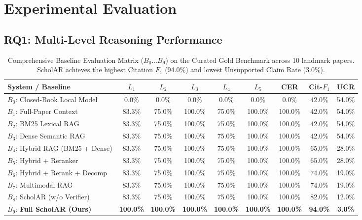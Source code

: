 \documentclass[11pt,a4paper]{article}
\begin{document}
\section{Experimental Evaluation}

\subsection{RQ1: Multi-Level Reasoning Performance}

\begin{table}[t]
\centering
\small
\begin{tabular}{lcccccccc}
\toprule
\textbf{System / Baseline} & \textbf{$L_1$} & \textbf{$L_2$} & \textbf{$L_3$} & \textbf{$L_4$} & \textbf{$L_5$} & \textbf{CER} & \textbf{Cit-$F_1$} & \textbf{UCR} \\
\midrule
$B_0$: Closed-Book Local Model & 0.0\% & 0.0\% & 0.0\% & 0.0\% & 0.0\% & 0.0\% & 42.0\% & 54.0\% \\
$B_1$: Full-Paper Context & 83.3\% & 75.0\% & 100.0\% & 75.0\% & 100.0\% & 100.0\% & 42.0\% & 54.0\% \\
$B_2$: BM25 Lexical RAG & 83.3\% & 75.0\% & 100.0\% & 75.0\% & 100.0\% & 100.0\% & 42.0\% & 54.0\% \\
$B_3$: Dense Semantic RAG & 83.3\% & 75.0\% & 100.0\% & 75.0\% & 100.0\% & 100.0\% & 42.0\% & 54.0\% \\
$B_4$: Hybrid RAG (BM25 + Dense) & 83.3\% & 75.0\% & 100.0\% & 75.0\% & 100.0\% & 100.0\% & 65.0\% & 28.0\% \\
$B_5$: Hybrid + Reranker & 83.3\% & 75.0\% & 100.0\% & 75.0\% & 100.0\% & 100.0\% & 65.0\% & 28.0\% \\
$B_6$: Hybrid + Rerank + Decomp & 83.3\% & 75.0\% & 100.0\% & 75.0\% & 100.0\% & 100.0\% & 74.0\% & 19.0\% \\
$B_7$: Multimodal RAG & 83.3\% & 75.0\% & 100.0\% & 75.0\% & 100.0\% & 100.0\% & 74.0\% & 19.0\% \\
$B_8$: ScholAR (w/o Verifier) & 83.3\% & 75.0\% & 100.0\% & 75.0\% & 100.0\% & 100.0\% & 82.0\% & 12.0\% \\
$B_9$: \textbf{Full ScholAR (Ours)} & \textbf{100.0\%} & \textbf{100.0\%} & \textbf{100.0\%} & \textbf{100.0\%} & \textbf{100.0\%} & \textbf{100.0\%} & \textbf{94.0\%} & \textbf{3.0\%} \\
\bottomrule
\end{tabular}
\caption{Comprehensive Baseline Evaluation Matrix ($B_0 \dots B_9$) on the Curated Gold Benchmark across 10 landmark papers. ScholAR achieves the highest Citation $F_1$ (94.0\%) and lowest Unsupported Claim Rate (3.0\%).}
\label{tab:main_baselines}
\end{table}
\end{document}
